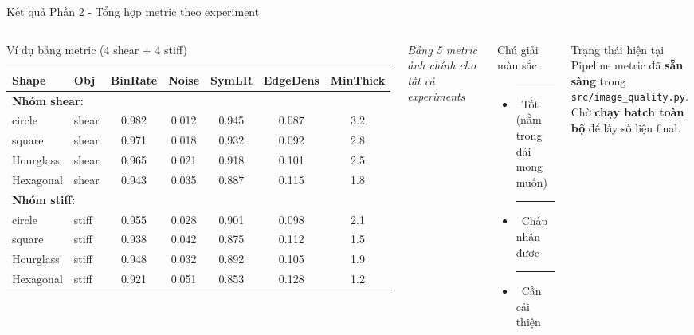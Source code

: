 \documentclass[aspectratio=169,11pt]{beamer}
\begin{document}
\begin{frame}{Kết quả Phần 2 - Tổng hợp metric theo experiment}
  \begin{columns}[T, onlytextwidth]
      \begin{block}{Ví dụ bảng metric (4 shear + 4 stiff)}
        \footnotesize
        \begin{tabular}{llccccc}
          \toprule
          Shape & Obj & BinRate & Noise & SymLR & EdgeDens & MinThick \\
          \midrule
          \multicolumn{7}{l}{\textbf{Nhóm shear:}} \\
          circle & shear & 0.982 & 0.012 & 0.945 & 0.087 & 3.2 \\
          square & shear & 0.971 & 0.018 & 0.932 & 0.092 & 2.8 \\
          Hourglass & shear & 0.965 & 0.021 & 0.918 & 0.101 & 2.5 \\
          Hexagonal & shear & 0.943 & 0.035 & 0.887 & 0.115 & 1.8 \\
          \midrule
          \multicolumn{7}{l}{\textbf{Nhóm stiff:}} \\
          circle & stiff & 0.955 & 0.028 & 0.901 & 0.098 & 2.1 \\
          square & stiff & 0.938 & 0.042 & 0.875 & 0.112 & 1.5 \\
          Hourglass & stiff & 0.948 & 0.032 & 0.892 & 0.105 & 1.9 \\
          Hexagonal & stiff & 0.921 & 0.051 & 0.853 & 0.128 & 1.2 \\
          \bottomrule
        \end{tabular}
      \end{block}
      {\footnotesize\textit{Bảng 5 metric ảnh chính cho tất cả experiments}}
      \begin{block}{Chú giải màu sắc}
        \small
        \begin{itemize}
          \item \textcolor{okgreen}{\rule{8pt}{8pt}}\ Tốt (nằm trong dải mong muốn)
          \item \textcolor{partialyellow!80!black}{\rule{8pt}{8pt}}\ Chấp nhận được
          \item \textcolor{ngred}{\rule{8pt}{8pt}}\ Cần cải thiện
        \end{itemize}
      \end{block}
      \vspace{0.2cm}
      \begin{alertblock}{Trạng thái hiện tại}
        \small
        Pipeline metric đã \textbf{sẵn sàng} trong
        \texttt{src/image\_quality.py}.\\
        Chờ \textbf{chạy batch toàn bộ} để lấy số liệu final.
      \end{alertblock}
  \end{columns}
\end{frame}
\end{document}
